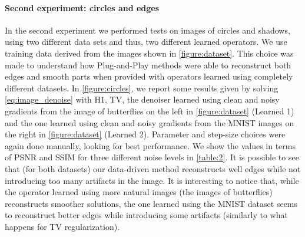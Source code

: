 \documentclass[onefignum,onetabnum]{siamonline250211}
\begin{document}
\paragraph{Second experiment: circles and edges} In the second experiment we performed tests on images of circles and shadows, using two different data sets and thus, two different learned operators. We use training data derived from the images shown in \cref{figure:dataset}. This choice was made to understand how Plug-and-Play methods were able to reconstruct both edges and smooth parts when provided with operators learned using completely different datasets. In \cref{figure:circles}, we report some results given by solving \cref{eq:image_denoise} with H$1$, TV, the denoiser learned using clean and noisy gradients from the image of butterflies on the left in \cref{figure:dataset} (Learned 1) and the one learned using clean and noisy gradients from the MNIST images on the right in \cref{figure:dataset} (Learned 2). Parameter and step-size choices were again done manually, looking for best performance. We show the values in terms of PSNR and SSIM for three different noise levels in \cref{table:2}. It is possible to see that (for both datasets) our data-driven method reconstructs well edges while not introducing too many artifacts in the image. It is interesting to notice that, while the operator learned using more natural images (the images of butterflies) reconstructs smoother solutions, the one learned using the MNIST dataset seems to reconstruct better edges while introducing some artifacts (similarly to what happens for TV regularization).
\end{document}
